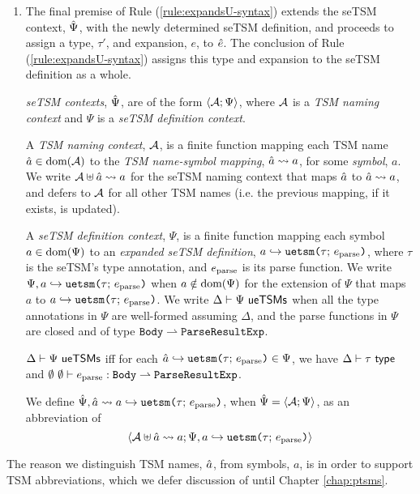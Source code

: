 \begin{enumerate}
\item The final premise of Rule (\ref{rule:expandsU-syntax}) extends the seTSM context, $\hat{\Psi}$, with the newly determined {seTSM definition}, and proceeds to assign a type, $\tau'$, and expansion, $e$, to ${\hat e}$. The conclusion of Rule (\ref{rule:expandsU-syntax}) assigns this type and expansion to the seTSM definition as a whole.%



\emph{seTSM contexts}, $\hat{\Psi}$, are of the form $\langle \mathcal{A}; \Psi \rangle$, where $\mathcal{A}$ is a \emph{TSM naming context} and $\Psi$ is a \emph{seTSM definition context}. 

A \emph{TSM naming context}, $\mathcal{A}$, is a finite function mapping each TSM name $\hat{a} \in \text{dom}(\mathcal{A})$ to the \emph{TSM name-symbol mapping}, $\hat{a} \leadsto a$, for some \emph{symbol}, $a$. We write $\mathcal{A} \uplus \hat{a} \leadsto a$ for the seTSM naming context that maps $\hat{a}$ to $\hat{a} \leadsto a$, and defers to $\mathcal{A}$ for all other TSM names (i.e. the previous mapping, if it exists, is updated).

A \emph{seTSM definition context}, $\Psi$, is a finite function mapping each symbol $a \in \text{dom}(\Psi)$ to an \emph{expanded seTSM definition}, $a \hookrightarrow \texttt{uetsm}\texttt{(}\tau;\,e_\text{parse}\texttt{)}$, where $\tau$ is the seTSM's type annotation, and $e_\text{parse}$ is its parse function. We write $\Psi, a \hookrightarrow \texttt{uetsm}\texttt{(}\tau;\,e_\text{parse}\texttt{)}$ when $a \notin \text{dom}(\Psi)$ for the extension of $\Psi$ that maps $a$ to $a \hookrightarrow \texttt{uetsm}\texttt{(}\tau;\,e_\text{parse}\texttt{)}$. We write $\Delta \vdash \Psi~\mathsf{ueTSMs}$  when all the type annotations in $\Psi$ are well-formed assuming $\Delta$, and the parse functions in $\Psi$ are closed and of type $\mathtt{Body} \rightharpoonup \mathtt{ParseResultExp}$.

\begin{definition}\label{def:seTSM-def-ctx-formation} $\Delta \vdash \Psi~\mathsf{ueTSMs}$ iff for each $\hat{a} \hookrightarrow \texttt{uetsm}\texttt{(}\tau;\,e_\text{parse}\texttt{)} \in \Psi$, we have $\Delta \vdash \tau~\mathsf{type}$ and $\emptyset~\emptyset \vdash e_\text{parse} : \mathtt{Body} \rightharpoonup \mathtt{ParseResultExp}$.\end{definition}

We define $\hat{\Psi}, \hat{a} \leadsto a \hookrightarrow \texttt{uetsm}\texttt{(}\tau;\,e_\text{parse}\texttt{)}$, when $\hat{\Psi}=\langle \mathcal{A}; \Psi \rangle$, as an abbreviation of \[\langle \mathcal{A} \uplus \hat{a} \leadsto a; \Psi, a \hookrightarrow \texttt{uetsm}\texttt{(}\tau;\,e_\text{parse}\texttt{)} \rangle\]

\end{enumerate}

The reason we distinguish TSM names, $\hat{a}$, from symbols, $a$, is in order to support TSM abbreviations, which we defer discussion of until  Chapter \ref{chap:ptsms}. 

